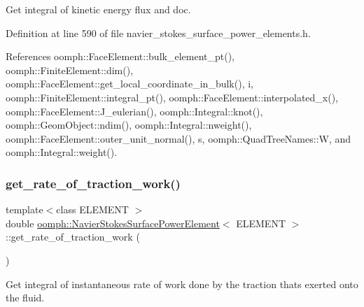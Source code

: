 Get integral of kinetic energy flux and doc. 



Definition at line 590 of file navier\+\_\+stokes\+\_\+surface\+\_\+power\+\_\+elements.\+h.



References oomph\+::\+Face\+Element\+::bulk\+\_\+element\+\_\+pt(), oomph\+::\+Finite\+Element\+::dim(), oomph\+::\+Face\+Element\+::get\+\_\+local\+\_\+coordinate\+\_\+in\+\_\+bulk(), i, oomph\+::\+Finite\+Element\+::integral\+\_\+pt(), oomph\+::\+Face\+Element\+::interpolated\+\_\+x(), oomph\+::\+Face\+Element\+::\+J\+\_\+eulerian(), oomph\+::\+Integral\+::knot(), oomph\+::\+Geom\+Object\+::ndim(), oomph\+::\+Integral\+::nweight(), oomph\+::\+Face\+Element\+::outer\+\_\+unit\+\_\+normal(), s, oomph\+::\+Quad\+Tree\+Names\+::W, and oomph\+::\+Integral\+::weight().

\mbox{\label{classoomph_1_1NavierStokesSurfacePowerElement_a65c3fbc22163da89b94374c5b590c5e3}} 
\subsubsection{\texorpdfstring{get\+\_\+rate\+\_\+of\+\_\+traction\+\_\+work()}{get\_rate\_of\_traction\_work()}\hspace{0.1cm}{\footnotesize\ttfamily [1/2]}}
{\footnotesize\ttfamily template$<$class E\+L\+E\+M\+E\+NT $>$ \\
double \hyperlink{classoomph_1_1NavierStokesSurfacePowerElement}{oomph\+::\+Navier\+Stokes\+Surface\+Power\+Element}$<$ E\+L\+E\+M\+E\+NT $>$\+::get\+\_\+rate\+\_\+of\+\_\+traction\+\_\+work (\begin{DoxyParamCaption}{ }\end{DoxyParamCaption})\hspace{0.3cm}{\ttfamily [inline]}}



Get integral of instantaneous rate of work done by the traction that\textquotesingle{}s exerted onto the fluid. 



